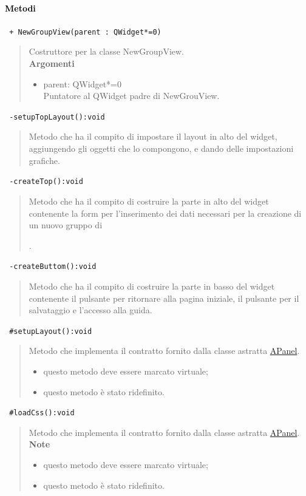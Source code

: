 \paragraph{\textcolor{black}{Metodi\\}}
\color{blue}\verb! + NewGroupView(parent : QWidget*=0)!
\begin{quote}
\color{black}Costruttore per la classe NewGroupView. \\
\textbf{Argomenti}
\begin{itemize}
\item parent: QWidget*=0  \\ Puntatore al QWidget padre di NewGrouView.
\end{itemize}
\end{quote}
\color{blue}\verb! -setupTopLayout():void!
\begin{quote}
\color{black} Metodo che ha il compito di impostare il layout in alto del widget, aggiungendo gli oggetti che lo compongono, e dando delle impostazioni grafiche.
\end{quote} 
\color{blue}\verb! -createTop():void!
\begin{quote}
\color{black} Metodo che ha il compito di costruire la parte in alto del widget contenente la form per l'inserimento dei dati necessari per la creazione di un nuovo gruppo di \subject{}.
\end{quote} 
\color{blue}\verb! -createButtom():void!
\begin{quote}
\color{black} Metodo che ha il compito di costruire la parte in basso del widget contenente il pulsante per ritornare alla pagina iniziale, il pulsante per il salvataggio e l'accesso alla guida.
\end{quote}
\color{blue}\verb! #setupLayout():void!
\begin{quote}
\color{black}Metodo che implementa il contratto fornito dalla classe astratta \hyperref[speAPanel]{APanel}.
\begin{itemize}
\item questo metodo deve essere marcato virtuale;
\item questo metodo è stato ridefinito.
\end{itemize}
\end{quote}  
\color{blue}\verb! #loadCss():void!
\begin{quote}
\color{black}Metodo che implementa il contratto fornito dalla classe astratta \hyperref[speAPanel]{APanel}.\\
 \textbf{Note}
 \begin{itemize}
  \item questo metodo deve essere marcato virtuale;
 \item questo metodo è stato ridefinito.
 \end{itemize}
\end{quote} 
